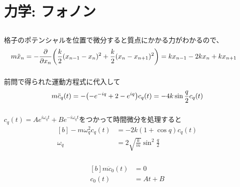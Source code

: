 \documentclass[../ap_2022.tex]{subfiles}
\begin{document}
\setcounter{chapter}{1}
\chapter{力学: フォノン}
\section{}
\subsection{}
格子のポテンシャルを位置で微分すると質点にかかる力がわかるので、
\begin{equation}\begin{aligned}[b]
    m\ddot{x}_n &= -\pdv{x_n}\qty(\frac{k}{2}(x_{n-1}-x_n)^2+\frac{k}{2}(x_{n}-x_{n+1})^2)
    =kx_{n-1}-2kx_n+kx_{n+1}
\end{aligned}\end{equation}

\subsection{}
前問で得られた運動方程式に代入して
\begin{equation}\begin{aligned}[b]
    m\ddot{c}_q(t) = -\qty(-e^{-iq}+2-e^{iq})c_q(t) = -4k\sin\frac{q}{2}c_q(t)
\end{aligned}\end{equation}

\subsection{}
\(c_{q}(t)=Ae^{i\omega_q t}+Be^{-i\omega_q t}\)をつかって時間微分を処理すると
\begin{equation}\begin{aligned}[b]
    -m\omega_q^2c_q(t) &=-2k(1+\cos q)c_q(t)\\
    \omega_q &= 2\sqrt{\frac{k}{m}}\sin^2\frac{q}{2}
\end{aligned}\end{equation}

\subsection{}
\begin{equation}\begin{aligned}[b]
    m\ddot{c}_0(t) &= 0\\
    c_0(t) &= At+B
\end{aligned}\end{equation}
\end{document}
